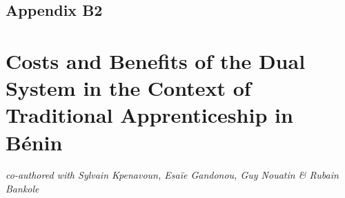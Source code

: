 \documentclass[
  a4paper, twoside, 12pt]{book}
\newcommand{\newsection}{\setcounter{figure}{0}
\renewcommand{\thefigure}{\arabic{chapter}.\arabic{figure}}
\setcounter{table}{0}
\renewcommand{\thetable}{\arabic{chapter}.\arabic{table}}}
\begin{document}

\begin{singlespacing}
\renewcommand{\arraystretch}{1.2}



\newpage



\newpage



\newpage







\end{singlespacing}

\newpage

\hypertarget{survey-appendix-b}{%
\section*{Appendix B2}\label{survey-appendix-b}}


\setcounter{table}{0}
\renewcommand{\thetable}{B2.\arabic{table}}

\begin{singlespacing}


\newpage



\newpage





\newpage





\newpage





\end{singlespacing}
\renewcommand{\thesection}{\arabic{chapter}.\arabic{section}}
\setcounter{section}{0}
\renewcommand{\thesubsection}{\arabic{chapter}.\arabic{section}.\arabic{subsection}}
\setcounter{subsection}{0}

\newsection

\chapter[Costs \& Benefits of Dual Apprenticeship in Bénin]{Costs and Benefits of the Dual System in the Context of Traditional Apprenticeship in Bénin}

\emph{co-authored with Sylvain Kpenavoun, Esaïe Gandonou, Guy Nouatin \& Rubain Bankole}
\end{document}
